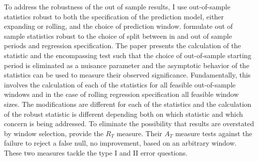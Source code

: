 To address the robustness of the out of sample results, I use out-of-sample statistics robust to both the specification of the prediction model, either expanding or rolling, and the choice of prediction window. \cite{rossi_out--sample_2012} formulate out of sample statistics robust to the choice of split between in and out of sample periods and regression specification. The paper presents the calculation of the \citet{Diebold1995} statistic and the \citet{harvey_tests_1998} encompassing test such that the choice of out-of-sample starting period is eliminated as a nuisance parameter and the asymptotic behavior of the statistics can be used to measure their observed significance. Fundamentally, this involves the calculation of each of the statistics for all feasible out-of-sample windows and in the case of rolling regression specification all feasible window sizes. The modifications are different for each of the statistics and the calculation of the robust statistic is different depending both on which statistic and which concern is being addressed. %
To eliminate the possibility that results are overstated by window selection, \citet{rossi_out--sample_2012} provide the $R_{T}$ measure. %
Their $A_{T}$ measure %
tests against the failure to reject a false null, no improvement, based on an arbitrary window. These two measures tackle the type I and II error questions. %

